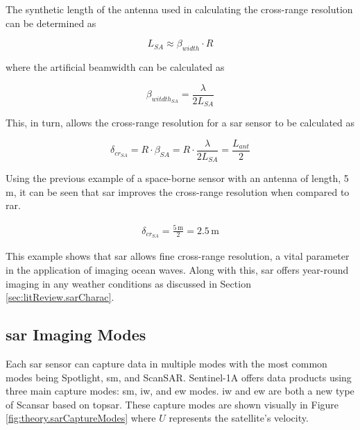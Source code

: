 The synthetic length of the antenna \cite{Meyer2019} used in calculating the cross-range resolution can be determined as

\begin{equation} \label{eq:sar.virtualAntennaL}
    L_{SA} \approx \beta_{width}\cdot R 
\end{equation}

where the artificial beamwidth can be calculated as

\begin{equation} \label{eq:sar.beamwidth}
    \beta_{witdth_{SA}} = \frac{\lambda}{2L_{SA}}
\end{equation}

This, in turn, allows the cross-range resolution \cite{Moreira2013} for a \acs{sar} sensor to be calculated as

\begin{equation} \label{eq:sar.crossRangeResolution}
    \delta_{cr_{SA}} = R\cdot \beta_{SA} = R \cdot \frac{\lambda}{2L_{SA}} = \frac{L_{ant}}{2}
\end{equation}

Using the previous example of a space-borne sensor with an antenna of length, 5\,m, it can be seen that \acs{sar} improves the cross-range resolution when compared to \acs{rar}.

\begin{gather*}
    \delta_{cr_{SA}} = \frac{5\,\text{m}}{2} = 2.5\,\text{m}
\end{gather*}

This example shows that \acs{sar} allows fine cross-range resolution, a vital parameter in the application of imaging ocean waves. Along with this, \acs{sar} offers year-round imaging in any weather conditions as discussed in Section \ref{sec:litReview.sarCharac}.

\subsection{\acs{sar} Imaging Modes} \label{subsec:theory.sar.imaging}

Each \acs{sar} sensor can capture data in multiple modes with the most common modes being Spotlight, \ac{sm}, and ScanSAR. Sentinel-1A offers data products using three main capture modes: \acs{sm}, \ac{iw}, and \ac{ew} modes. \ac{iw} and \ac{ew} are both a new type of Scan\acs{sar} based on \ac{topsar}. These capture modes are shown visually in Figure \ref{fig:theory.sarCaptureModes} where $U$ represents the satellite's velocity.

